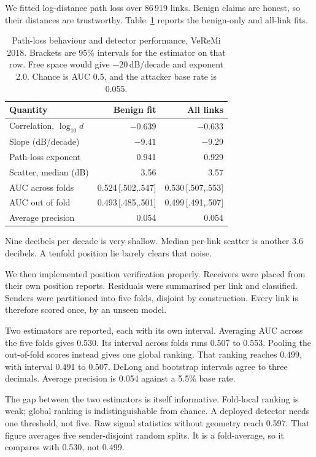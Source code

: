\documentclass[journal,twoside]{IEEEtran}
\begin{document}
We fitted log-distance path loss over 86\,919 links.
Benign claims are honest, so their distances are trustworthy.
Table~\ref{tab:pathloss} reports the benign-only and all-link fits.

\begin{table}[t]
\caption{Path-loss behaviour and detector performance, VeReMi 2018.
Brackets are 95\% intervals for the estimator on that row.
Free space would give $-20$\,dB/decade and exponent 2.0.
Chance is AUC 0.5, and the attacker base rate is 0.055.}
\label{tab:pathloss}
\centering
\scriptsize
\begin{tabular}{@{}lrr@{}}
\toprule
Quantity & Benign fit & All links \\
\midrule
Correlation, $\log_{10} d$ & $-0.639$ & $-0.633$ \\
Slope (dB/decade) & $-9.41$ & $-9.29$ \\
Path-loss exponent & 0.941 & 0.929 \\
Scatter, median (dB) & 3.56 & 3.57 \\
\midrule
AUC across folds & 0.524\,[.502,.547] & 0.530\,[.507,.553] \\
AUC out of fold & 0.493\,[.485,.501] & 0.499\,[.491,.507] \\
Average precision & 0.054 & 0.054 \\
\bottomrule
\end{tabular}
\end{table}

Nine decibels per decade is very shallow.
Median per-link scatter is another 3.6 decibels.
A tenfold position lie barely clears that noise.

We then implemented position verification properly.
Receivers were placed from their own position reports.
Residuals were summarised per link and classified.
Senders were partitioned into five folds, disjoint by construction.
Every link is therefore scored once, by an unseen model.

Two estimators are reported, each with its own interval.
Averaging AUC across the five folds gives 0.530.
Its interval across folds runs 0.507 to 0.553.
Pooling the out-of-fold scores instead gives one global ranking.
That ranking reaches 0.499, with interval 0.491 to 0.507.
DeLong and bootstrap intervals agree to three decimals.
Average precision is 0.054 against a 5.5\% base rate.

The gap between the two estimators is itself informative.
Fold-local ranking is weak; global ranking is indistinguishable from chance.
A deployed detector needs one threshold, not five.
Raw signal statistics without geometry reach 0.597.
That figure averages five sender-disjoint random splits.
It is a fold-average, so it compares with 0.530, not 0.499.
\end{document}
